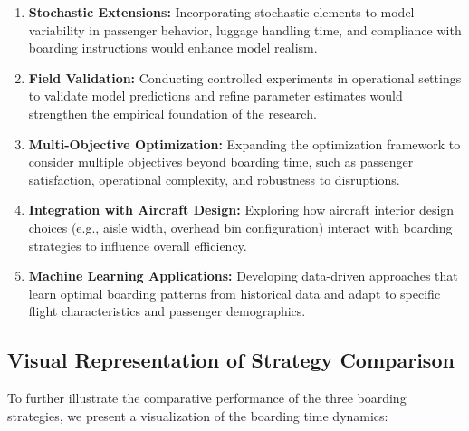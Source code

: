\begin{enumerate}
    \item \textbf{Stochastic Extensions:} Incorporating stochastic elements to model variability in passenger behavior, luggage handling time, and compliance with boarding instructions would enhance model realism.
    
    \item \textbf{Field Validation:} Conducting controlled experiments in operational settings to validate model predictions and refine parameter estimates would strengthen the empirical foundation of the research.
    
    \item \textbf{Multi-Objective Optimization:} Expanding the optimization framework to consider multiple objectives beyond boarding time, such as passenger satisfaction, operational complexity, and robustness to disruptions.
    
    \item \textbf{Integration with Aircraft Design:} Exploring how aircraft interior design choices (e.g., aisle width, overhead bin configuration) interact with boarding strategies to influence overall efficiency.
    
    \item \textbf{Machine Learning Applications:} Developing data-driven approaches that learn optimal boarding patterns from historical data and adapt to specific flight characteristics and passenger demographics.
\end{enumerate}

\subsection{Visual Representation of Strategy Comparison}

To further illustrate the comparative performance of the three boarding strategies, we present a visualization of the boarding time dynamics:

